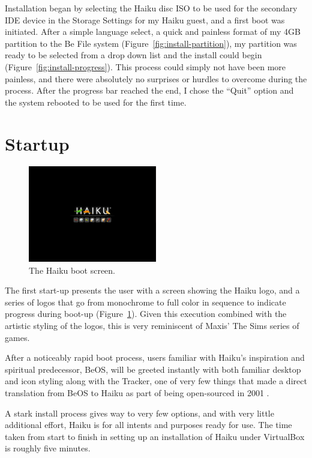 \documentclass{article}
\newcommand{\figref}[1]{Figure~\ref{fig:#1}}
\begin{document}
Installation began by selecting the Haiku disc ISO to be used for the
secondary IDE device in the Storage Settings for my Haiku guest, and a
first boot was initiated.  After a simple language select, a quick and
painless format of my 4GB partition to the Be File system
(\figref{install-partition}), my partition was ready to be selected
from a drop down list and the install could begin
(\figref{install-progress}).  This process could simply not have been
more painless, and there were absolutely no surprises or hurdles to
overcome during the process.  After the progress bar reached the end,
I chose the ``Quit'' option and the system rebooted to be used for the
first time.

\section{Startup}

\begin{figure}[h]
\centering
\includegraphics[width=0.5\textwidth]{figs/startup.png}
\caption{The Haiku boot screen.}
\label{fig:startup}
\end{figure}

The first start-up presents the user with a screen showing the Haiku
logo, and a series of logos that go from monochrome to full color in
sequence to indicate progress during boot-up (\figref{startup}).
Given this execution combined with the artistic styling of the logos,
this is very reminiscent of Maxis' The Sims series of games.

After a noticeably rapid boot process, users familiar with Haiku's
inspiration and spiritual predecessor, BeOS, will be greeted instantly
with both familiar desktop and icon styling along with the Tracker,
one of very few things that made a direct translation from BeOS to
Haiku as part of being open-sourced in 2001 \cite{HaikuFaq}.

A stark install process gives way to very few options, and with very
little additional effort, Haiku is for all intents and purposes ready
for use.  The time taken from start to finish in setting up an
installation of Haiku under VirtualBox is roughly five minutes.
\end{document}
